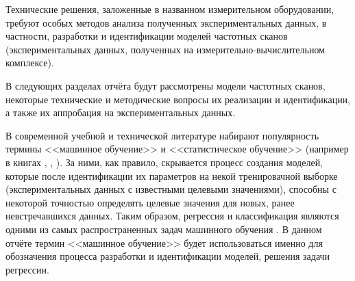 Технические решения, заложенные в названном измерительном оборудовании, требуют
особых методов анализа полученных экспериментальных данных, в частности,
разработки и идентификации моделей частотных сканов (экспериментальных данных, 
полученных на измерительно-вычислительном комплексе).

В следующих разделах отчёта будут рассмотрены модели частотных сканов, некоторые
технические и методические вопросы их реализации и идентификации, а также их
аппробация на экспериментальных данных.

В современной учебной и технической литературе набирают популярность термины 
<<машинное обучение>> и <<статистическое обучение>> (например в книгах 
\cite{hands_on_ml}, \cite{nikolenko_deep_learning}, 
\cite{elements_of_statistical_learning}). За ними, как правило, скрывается
процесс создания моделей, которые после идентификации их параметров на некой
тренировачной выборке (экспериментальных данных с известными целевыми 
значениями), способны с некоторой точностью определять целевые значения для
новых, ранее невстречавшихся данных. Таким образом, регрессия и классификация
являются одними из самых распространенных задач машинного обучения 
\cite{hands_on_ml}. В данном отчёте термин <<машинное обучение>> будет 
использоваться именно для обозначения процесса разработки и идентификации 
моделей, решения задачи регрессии.